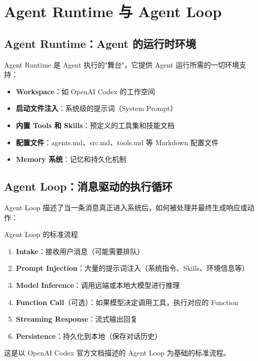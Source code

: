 \section{Agent Runtime 与 Agent Loop}

\subsection{Agent Runtime：Agent 的运行时环境}

Agent Runtime 是 Agent 执行的"舞台"，它提供 Agent 运行所需的一切环境支持：

\begin{itemize}
    \item \textbf{Workspace}：如 OpenAI Codex 的工作空间
    \item \textbf{启动文件注入}：系统级的提示词（System Prompt）
    \item \textbf{内置 Tools 和 Skills}：预定义的工具集和技能文档
    \item \textbf{配置文件}：agents.md、src.md、tools.md 等 Markdown 配置文件
    \item \textbf{Memory 系统}：记忆和持久化机制
\end{itemize}

\subsection{Agent Loop：消息驱动的执行循环}

Agent Loop 描述了当一条消息真正进入系统后，如何被处理并最终生成响应或动作：

\begin{importantbox}{Agent Loop 的标准流程}
\begin{enumerate}
    \item \textbf{Intake}：接收用户消息（可能需要排队）
    \item \textbf{Prompt Injection}：大量的提示词注入（系统指令、Skills、环境信息等）
    \item \textbf{Model Inference}：调用远端或本地大模型进行推理
    \item \textbf{Function Call}（可选）：如果模型决定调用工具，执行对应的 Function
    \item \textbf{Streaming Response}：流式输出回复
    \item \textbf{Persistence}：持久化到本地（保存对话历史）
\end{enumerate}
这是以 OpenAI Codex 官方文档描述的 Agent Loop 为基础的标准流程。
\end{importantbox}

